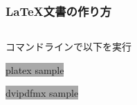 \documentclass[unicode,12pt,colorlinks,handout]{beamer}
\newcommand{\typecommand}[1]{\colorbox{darkgray}{{\ttfamily\color{lime}#1}}}
\begin{document}
\begin{frame}
	\frametitle{\LaTeX 文書の作り方}
	\begin{columns}[c]
		\begin{column}{0.5\textwidth}
			コマンドラインで以下を実行
	
			\typecommand{platex sample}
	
			\typecommand{dvipdfmx sample}
		\end{column}
		\begin{column}{0.4\textwidth}
		\end{column}
	\end{columns}
\end{frame}
\end{document}
